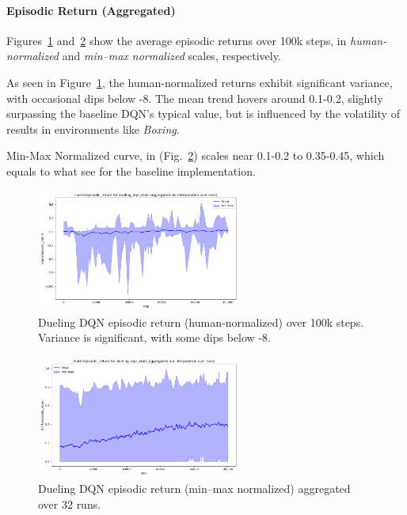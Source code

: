 \paragraph{Episodic Return (Aggregated)}
Figures~\ref{fig:dueling_return_human} and~\ref{fig:dueling_return_minmax} show 
the average episodic returns over 100k steps, in \emph{human-normalized} and 
\emph{min--max normalized} scales, respectively. 

As seen in  Figure~\ref{fig:dueling_return_human}, the human-normalized returns exhibit significant variance, with occasional dips below -8. The mean trend hovers around 0.1-0.2, slightly surpassing the baseline DQN’s typical value, but is influenced by the volatility of results in environments like \emph{Boxing}.

Min-Max Normalized curve, in (Fig.~\ref{fig:dueling_return_minmax}) scales near 0.1-0.2 to 0.35-0.45, which equals to what see for the baseline implementation.

\begin{figure}
	\centering
	\includegraphics[width=0.6\textwidth]{figures/dueling_dqn/charts_episodic_return_human_dueling_dqn_atari.png}
	\caption{Dueling DQN episodic return (human-normalized) over 100k steps. 
		Variance is significant, with some dips below -8.}
	\label{fig:dueling_return_human}
\end{figure}

\begin{figure}
	\centering
	\includegraphics[width=0.6\textwidth]{figures/dueling_dqn/charts_episodic_return_minmax_dueling_dqn_atari.png}
	\caption{Dueling DQN episodic return (min--max normalized) aggregated over 32 runs.}
	\label{fig:dueling_return_minmax}
\end{figure}

